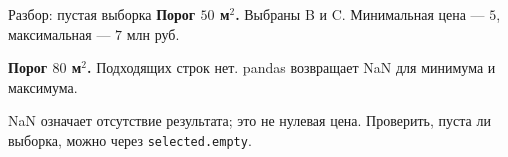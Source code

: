\begin{frame}{Разбор: пустая выборка}
  \textbf{Порог $50$ м$^2$.} Выбраны B и C.
  Минимальная цена --- $5$, максимальная --- $7$ млн руб.
  \medskip\par
  \textbf{Порог $80$ м$^2$.} Подходящих строк нет.
  pandas возвращает NaN для минимума и максимума.
  \medskip\par
  NaN означает отсутствие результата; это не нулевая цена.
  Проверить, пуста ли выборка, можно через \texttt{selected.empty}.
\end{frame}
